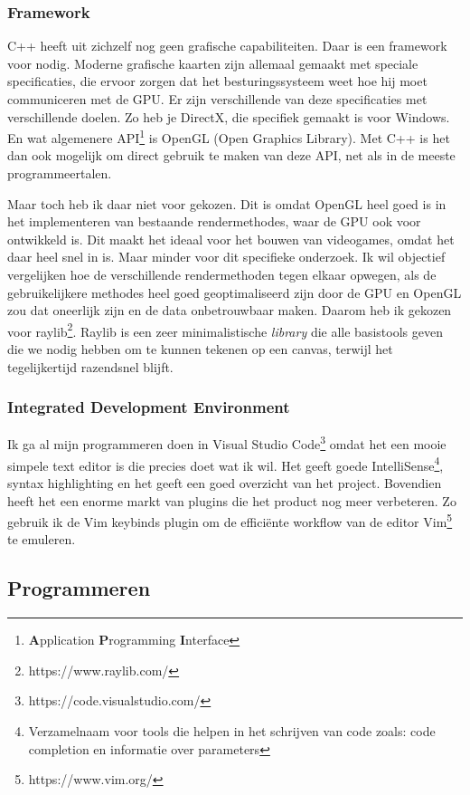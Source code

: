 \documentclass[12pt, a4paper]{article}
\begin{document}
\subsubsection{Framework}
C++ heeft uit zichzelf nog geen grafische capabiliteiten. Daar is een framework voor nodig. Moderne grafische kaarten zijn allemaal gemaakt met speciale specificaties, die ervoor zorgen dat het besturingssysteem weet hoe hij moet communiceren met de GPU. Er zijn verschillende van deze specificaties met verschillende doelen. Zo heb je DirectX, die specifiek gemaakt is voor Windows. En wat algemenere API\footnote{\textbf{A}pplication \textbf{P}rogramming \textbf{I}nterface} is OpenGL (Open Graphics Library). Met C++ is het dan ook mogelijk om direct gebruik te maken van deze API, net als in de meeste programmeertalen. 

Maar toch heb ik daar niet voor gekozen. Dit is omdat OpenGL heel goed is in het implementeren van bestaande rendermethodes, waar de GPU ook voor ontwikkeld is. Dit maakt het ideaal voor het bouwen van videogames, omdat het daar heel snel in is. Maar minder voor dit specifieke onderzoek. Ik wil objectief vergelijken hoe de verschillende rendermethoden tegen elkaar opwegen, als de gebruikelijkere methodes heel goed geoptimaliseerd zijn door de GPU en OpenGL zou dat oneerlijk zijn en de data onbetrouwbaar maken. Daarom heb ik gekozen voor raylib\footnote{https://www.raylib.com/}. Raylib is een zeer minimalistische \emph{library} die alle basistools geven die we nodig hebben om te kunnen tekenen op een canvas, terwijl het tegelijkertijd razendsnel blijft. 
\subsubsection{Integrated Development Environment}
Ik ga al mijn programmeren doen in Visual Studio Code\footnote{https://code.visualstudio.com/} omdat het een mooie simpele text editor is die precies doet wat ik wil. Het geeft goede IntelliSense\footnote{Verzamelnaam voor tools die helpen in het schrijven van code zoals: code completion en informatie over parameters}, syntax highlighting en het geeft een goed overzicht van het project. Bovendien heeft het een enorme markt van plugins die het product nog meer verbeteren. Zo gebruik ik de Vim keybinds plugin om de efficiënte workflow van de editor Vim\footnote{https://www.vim.org/} te emuleren. 
\subsection{Programmeren}
\end{document}
